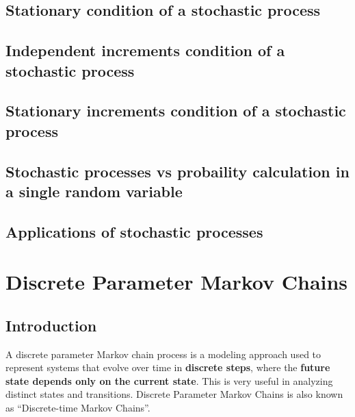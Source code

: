 \documentclass[
  letterpaper,
  DIV=11,
  numbers=noendperiod]{scrreprt}
\begin{document}
\section{Stationary condition of a stochastic
process}\label{stationary-condition-of-a-stochastic-process}

\section{Independent increments condition of a stochastic
process}\label{independent-increments-condition-of-a-stochastic-process}

\section{Stationary increments condition of a stochastic
process}\label{stationary-increments-condition-of-a-stochastic-process}

\section{Stochastic processes vs probaility calculation in a single
random
variable}\label{stochastic-processes-vs-probaility-calculation-in-a-single-random-variable}

\section{Applications of stochastic
processes}\label{applications-of-stochastic-processes}


\chapter{Discrete Parameter Markov
Chains}\label{discrete-parameter-markov-chains}

\section{Introduction}\label{introduction-1}

A discrete parameter Markov chain process is a modeling approach used to
represent systems that evolve over time in \textbf{discrete steps},
where the \textbf{future state depends only on the current state}. This
is very useful in analyzing distinct states and transitions. Discrete
Parameter Markov Chains is also known as ``Discrete-time Markov
Chains''.
\end{document}
